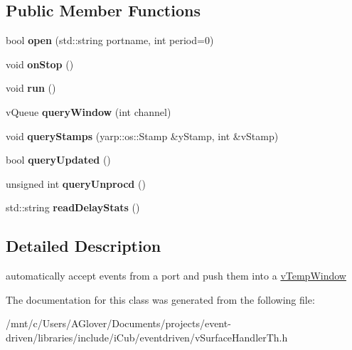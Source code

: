 \subsection*{Public Member Functions}
\begin{DoxyCompactItemize}
\item 
\mbox{\label{classev_1_1tWinThread_a1edd593d8901ca970a51bfeb09181234}} 
bool {\bfseries open} (std\+::string portname, int period=0)
\item 
\mbox{\label{classev_1_1tWinThread_ab12b04cd804ac7f6d2f6a199bb2078a8}} 
void {\bfseries on\+Stop} ()
\item 
\mbox{\label{classev_1_1tWinThread_a6992dcf7884d08d7296e4489ef264959}} 
void {\bfseries run} ()
\item 
\mbox{\label{classev_1_1tWinThread_a6937e3d587982b4ecbc8e776c89b5ea1}} 
v\+Queue {\bfseries query\+Window} (int channel)
\item 
\mbox{\label{classev_1_1tWinThread_a346e943bc1a1e06210deb6da26fa18f6}} 
void {\bfseries query\+Stamps} (yarp\+::os\+::\+Stamp \&y\+Stamp, int \&v\+Stamp)
\item 
\mbox{\label{classev_1_1tWinThread_a4121006bf6750fb8b5d2e2844479b39f}} 
bool {\bfseries query\+Updated} ()
\item 
\mbox{\label{classev_1_1tWinThread_ab3f171e6997f7e7e68abf536afa97c17}} 
unsigned int {\bfseries query\+Unprocd} ()
\item 
\mbox{\label{classev_1_1tWinThread_acb5f610d1fe4e6eef43cae31c0ea0f8e}} 
std\+::string {\bfseries read\+Delay\+Stats} ()
\end{DoxyCompactItemize}


\subsection{Detailed Description}
automatically accept events from a port and push them into a \hyperlink{classev_1_1vTempWindow}{v\+Temp\+Window} 

The documentation for this class was generated from the following file\+:\begin{DoxyCompactItemize}
\item 
/mnt/c/\+Users/\+A\+Glover/\+Documents/projects/event-\/driven/libraries/include/i\+Cub/eventdriven/v\+Surface\+Handler\+Th.\+h\end{DoxyCompactItemize}
